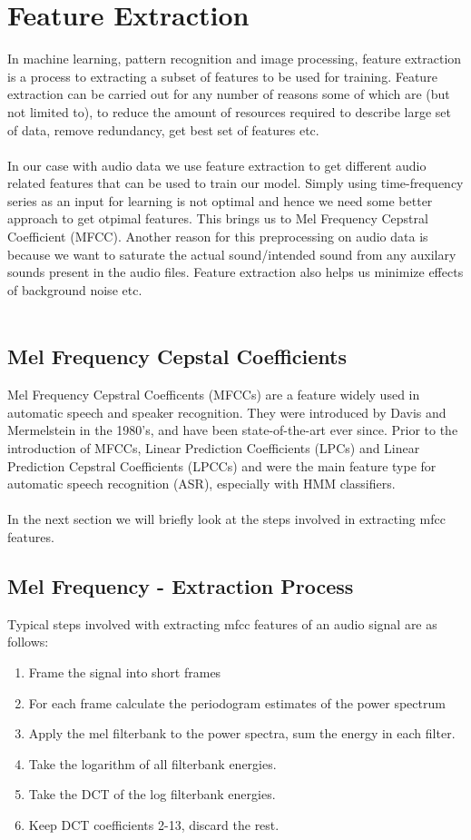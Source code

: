 \documentclass{article} %
\begin{document}
\section{Feature Extraction}
    In machine learning, pattern recognition and image processing, feature extraction is a process to extracting a subset of features to be used for training. Feature extraction can be carried out for any number of reasons some of which are (but not limited to), to reduce the amount of resources required to describe large set of data, remove redundancy, get best set of features etc.\\\\
    In our case with audio data we use feature extraction to get different audio related features that can be used to train our model. Simply using time-frequency series as an input for learning is not optimal and hence we need some better approach to get otpimal features. This brings us to Mel Frequency Cepstral Coefficient (MFCC). Another reason for this preprocessing on audio data is because we want to saturate the actual sound/intended sound from any auxilary sounds present in the audio files. Feature extraction also helps us minimize effects of background noise etc.\\\\
	\subsection{Mel Frequency Cepstal Coefficients}
		Mel Frequency Cepstral Coefficents (MFCCs) are a feature widely used in automatic speech and speaker recognition. They were introduced by Davis and Mermelstein in the 1980's, and have been state-of-the-art ever since. Prior to the introduction of MFCCs, Linear Prediction Coefficients (LPCs) and Linear Prediction Cepstral Coefficients (LPCCs) and were the main feature type for automatic speech recognition (ASR), especially with HMM classifiers.\\\\
		In the next section we will briefly look at the steps involved in extracting mfcc features.
	\subsection{Mel Frequency - Extraction Process}
	Typical steps involved with extracting mfcc features of an audio signal are as follows:
    \begin{enumerate}
        \item Frame the signal into short frames
        \item For each frame calculate the periodogram estimates of the power spectrum
        \item Apply the mel filterbank to the power spectra, sum the energy in each filter.
        \item Take the logarithm of all filterbank energies.
        \item Take the DCT of the log filterbank energies.
        \item Keep DCT coefficients 2-13, discard the rest.
    \end{enumerate}
\end{document}
